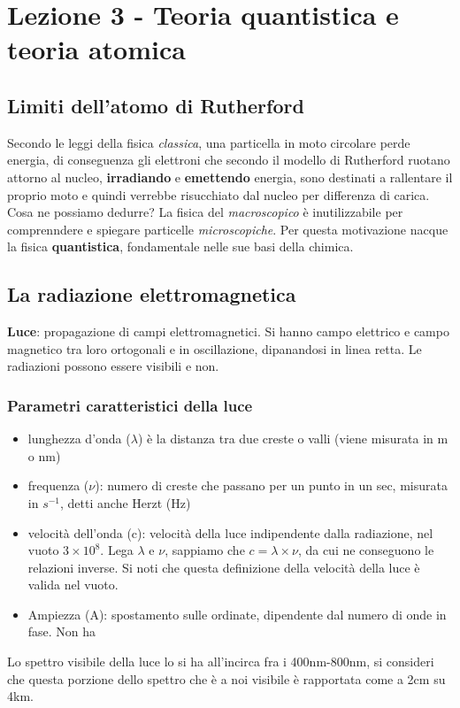 \chapter{Lezione 3 - Teoria quantistica e teoria atomica}

\section{Limiti dell'atomo di Rutherford}
Secondo le leggi della fisica \emph{classica}, una particella in moto circolare perde energia, di conseguenza gli elettroni che secondo il modello di Rutherford ruotano attorno al nucleo, \textbf{irradiando} e \textbf{emettendo} energia, sono destinati a rallentare il proprio moto e quindi verrebbe risucchiato dal nucleo per differenza di carica. Cosa ne possiamo dedurre? La fisica del \emph{macroscopico} è inutilizzabile per comprenndere e spiegare particelle \emph{microscopiche}. Per questa motivazione nacque la fisica \textbf{quantistica}, fondamentale nelle sue basi della chimica.

\section{La radiazione elettromagnetica}
\textbf{Luce}: propagazione di campi elettromagnetici. Si hanno campo elettrico e campo magnetico tra loro ortogonali e in oscillazione, dipanandosi in linea retta. Le radiazioni possono essere visibili e non. 

\subsection{Parametri caratteristici della luce}
\begin{itemize}
    \item lunghezza d'onda ($\lambda$) è la distanza tra due creste o valli (viene misurata in m o nm)
    \item frequenza ($\nu$): numero di creste che passano per un punto in un sec, misurata in $s^{-1}$, detti anche Herzt (Hz)
    \item velocità dell'onda (c): velocità della luce indipendente dalla radiazione, nel vuoto $3 \times 10^{8}$. Lega $\lambda$ e $\nu$, sappiamo che $c=\lambda \times \nu$, da cui ne conseguono le relazioni inverse. Si noti che questa definizione della velocità della luce è valida nel vuoto.
    \item Ampiezza (A): spostamento sulle ordinate, dipendente dal numero di onde in fase. Non ha 
\end{itemize}
Lo spettro visibile della luce lo si ha all'incirca fra i 400nm-800nm, si consideri che questa porzione dello spettro che è a noi visibile è rapportata come a 2cm su 4km.

